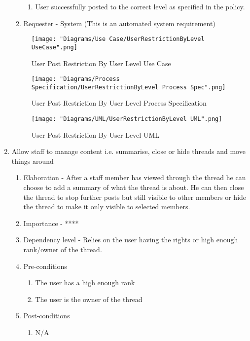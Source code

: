 \documentclass[12pt]{article}
\begin{document}
\begin{enumerate}
\begin{enumerate}
    \begin{enumerate}
    	\item User successfully posted to the correct level as specified in the policy.
    \end{enumerate}
    \item Requester - System (This is an automated system requirement)
  \end{enumerate}
\begin{figure}[h]
	\centering
	\texttt{[image: "Diagrams/Use Case/UserRestrictionByLevel UseCase".png]}
	\caption{User Post Restriction By User Level Use Case}
\end{figure}
\begin{figure}[h]
	\centering
	\texttt{[image: "Diagrams/Process Specification/UserRestrictionByLevel Process Spec".png]}
	\caption{User Post Restriction By User Level Process Specification}
\end{figure}
\begin{figure}[h]
	\centering
	\texttt{[image: "Diagrams/UML/UserRestrictionByLevel UML".png]}
	\caption{User Post Restriction By User Level UML}
\end{figure}
\clearpage %
   \item  Allow staff to manage content i.e. summarise, close or hide threads and move things around%
  \begin{enumerate}
    \item Elaboration - After a staff member has viewed through the thread he can choose to add a summary of what the thread is about. He can then close the thread to stop further posts but still visible to other members or hide the thread to make it only visible to selected members.
    \item Importance - ****
    \item Dependency level - Relies on the user having the rights or high enough rank/owner of the thread.
    \item Pre-conditions
    \begin{enumerate}
    	\item The user has a high enough rank
    	\item The user is the owner of the thread
    \end{enumerate}
        \item Post-conditions
    \begin{enumerate}
    	\item N/A

\end{enumerate}
\end{enumerate}
\end{enumerate}
\end{document}
